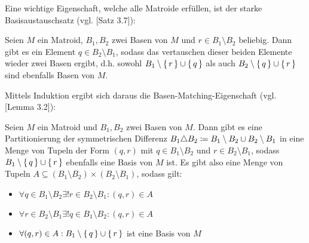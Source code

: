 Eine wichtige Eigenschaft, welche alle Matroide erfüllen, ist der starke Basisaustauschsatz (vgl. \cite{OptiIVSkript}[Satz 3.7]):

\begin{satz}
	Seien $M$ ein Matroid, $B_1, B_2$ zwei Basen von $M$ und $r \in B_1 \setminus B_2$ beliebig. Dann gibt es ein Element $q \in B_2 \setminus B_1$, sodass das vertauschen dieser beiden Elemente wieder zwei Basen ergibt, d.h. sowohl $B_1 \setminus \set{r} \cup \set{q}$ als auch $B_2 \setminus \set{q} \cup \set{r}$ sind ebenfalls Basen von $M$.
\end{satz}

Mittels Induktion ergibt sich daraus die Basen-Matching-Eigenschaft (vgl. \cite{OptiIVSkript}[Lemma 3.2]):

\begin{kor}\label{kor:BasenMatchingEig}
	Seien $M$ ein Matroid und $B_1, B_2$ zwei Basen von $M$. Dann gibt es eine Partitionierung der symmetrischen Differenz $B_1 \triangle B_2 \coloneqq B_1 \setminus B_2 \cup B_2 \setminus B_1$ in eine Menge von Tupeln der Form $(q,r)$ mit $q \in B_1\setminus B_2$ und $r \in B_2 \setminus B_1$, sodass $B_1 \setminus \set{q} \cup \set{r}$ ebenfalls eine Basis von $M$ ist. Es gibt also eine Menge von Tupeln $A \subseteq (B_1 \setminus B_2) \times (B_2 \setminus B_1)$, sodass gilt:
	\begin{itemize}
		\item $\forall q \in B_1 \setminus B_2 \exists! r \in B_2 \setminus B_1: (q,r) \in A$
		\item $\forall r \in B_2 \setminus B_1 \exists! q \in B_1 \setminus B_2: (q,r) \in A$
		\item $\forall (q,r) \in A: B_1 \setminus \set{q} \cup \set{r}$ ist eine Basis von $M$
	\end{itemize}
\end{kor}